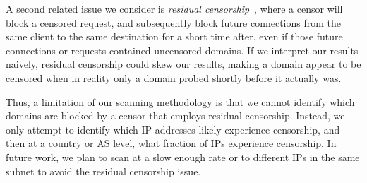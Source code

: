 A second related issue we consider is \emph{residual
censorship}~\cite{bock2021your}, where a censor will block a censored request,
and subsequently block future connections from the same client to the same
destination for a short time after, even if those future connections or requests
contained uncensored domains. If we interpret our results naively, residual
censorship could skew our results, making a domain appear to be censored when in
reality only a domain probed shortly before it actually was.

Thus, a limitation of our scanning methodology is that we cannot identify which
domains are blocked by a censor that employs residual censorship. Instead, we
only attempt to identify which IP addresses likely experience censorship, and
then at a country or AS level, what fraction of IPs experience censorship.
In future work, we plan to scan at a slow enough rate or to different IPs in the
same subnet to avoid the residual censorship issue.







